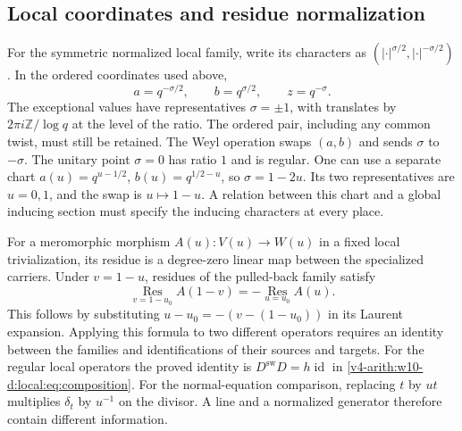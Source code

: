 \subsection{Local coordinates and residue normalization}
\label{v4-arith:w10-d:lem:FE-duality}
For the symmetric normalized local family, write its characters as
$(|\cdot|^{\sigma/2},|\cdot|^{-\sigma/2})$. In the ordered coordinates
used above,
\[
 a=q^{-\sigma/2},\qquad b=q^{\sigma/2},\qquad z=q^{-\sigma}.
\]
The exceptional values have representatives $\sigma=\pm1$, with
translates by $2\pi i\mathbb Z/\log q$ at the level of the ratio.
The ordered pair, including any common twist, must still be retained.
The Weyl operation swaps $(a,b)$ and sends $\sigma$ to $-\sigma$.
The unitary point $\sigma=0$ has ratio $1$ and is regular.
One can use a separate chart
$a(u)=q^{u-1/2}$, $b(u)=q^{1/2-u}$, so $\sigma=1-2u$.
Its two representatives are $u=0,1$, and the swap is $u\mapsto1-u$.
A relation between this chart and a global inducing section must specify
the inducing characters at every place.

For a meromorphic morphism $A(u):V(u)\to W(u)$ in a fixed local
trivialization, its residue is a degree-zero linear map between the
specialized carriers. Under $v=1-u$, residues of the pulled-back family
satisfy
\begin{equation}\label{v4-arith:w10-d:eq:FE-residues}
 \operatorname*{Res}_{v=1-u_0}A(1-v)
       =-\operatorname*{Res}_{u=u_0}A(u).
\end{equation}
This follows by substituting $u-u_0=-(v-(1-u_0))$ in its Laurent
expansion. Applying this formula to two different operators requires
an identity between the families and identifications of their sources
and targets. For the regular local operators the proved identity is
$D^{\mathrm{sw}}D=h\operatorname{id}$ in
\eqref{v4-arith:w10-d:local:eq:composition}.
For the normal-equation comparison, replacing $t$ by $ut$ multiplies
$\delta_t$ by $u^{-1}$ on the divisor. A line and a normalized generator
therefore contain different information.

